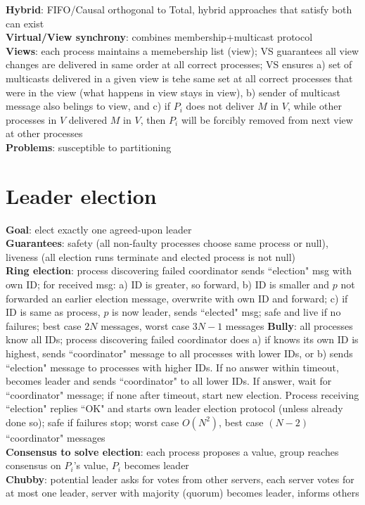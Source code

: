 \documentclass{article}
\begin{document}
\begin{multicols*}{3}
\textbf{Hybrid}: FIFO/Causal orthogonal to Total, hybrid approaches that satisfy both can exist \\
\textbf{Virtual/View synchrony}: combines membership+multicast protocol \\
\textbf{Views}: each process maintains a memebership list (view); VS guarantees all view changes are delivered in same order at all correct processes; VS ensures a) set of multicasts delivered in a given view is tehe same set at all correct processes that were in the view (what happens in view stays in view), b) sender of multicast message also belings to view, and c) if $P_i$ does not deliver $M$ in $V$, while other processes in $V$ delivered $M$ in $V$, then $P_i$ will be forcibly removed from next view at other processes \\
\textbf{Problems}: susceptible to partitioning

\section{Leader election}
\textbf{Goal}: elect exactly one agreed-upon leader \\
\textbf{Guarantees}: safety (all non-faulty processes choose same process or null), liveness (all election runs terminate and elected process is not null) \\
\textbf{Ring election}: process discovering failed coordinator sends ``election" msg with own ID; for received msg: a) ID is greater, so forward, b) ID is smaller and $p$ not forwarded an earlier election message, overwrite with own ID and forward; c) if ID is same as process, $p$ is now leader, sends ``elected" msg; safe and live if no failures; best case $2N$ messages, worst case $3N-1$ messages
\textbf{Bully}: all processes know all IDs; process discovering failed coordinator does a) if knows its own ID is highest, sends ``coordinator" message to all processes with lower IDs, or b) sends ``election" message to processes with higher IDs. If no answer within timeout, becomes leader and sends ``coordinator" to all lower IDs. If answer, wait for ``coordinator" message; if none after timeout, start new election. Process receiving ``election" replies ``OK" and starts own leader election protocol (unless already done so); safe if failures stop; worst case $O(N^2)$, best case $(N-2)$ ``coordinator" messages \\
\textbf{Consensus to solve election}: each process proposes a value, group reaches consensus on $P_i$'s value, $P_i$ becomes leader \\
\textbf{Chubby}: potential leader asks for votes from other servers, each server votes for at most one leader, server with majority (quorum) becomes leader, informs others


\end{multicols*}
\end{document}
